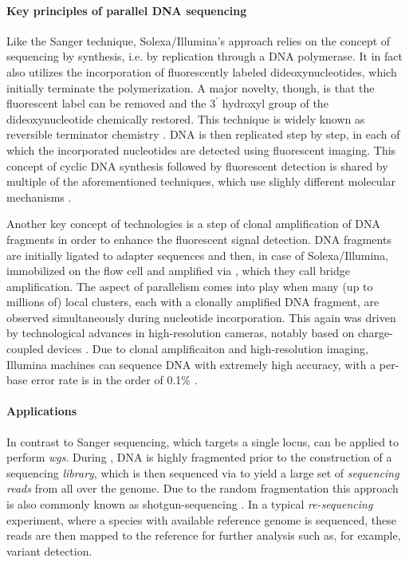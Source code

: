 \paragraph{Key principles of parallel DNA sequencing}
Like the Sanger technique, Solexa/Illumina’s approach relies on the concept of
sequencing by synthesis, i.e. by replication through a DNA polymerase. It in
fact also utilizes the incorporation of fluorescently labeled dideoxynucleotides,
which initially terminate the polymerization. A major novelty, though, is that
the fluorescent label can be removed and the $3^\prime$ hydroxyl group of the
dideoxynucleotide chemically restored. This technique is widely known as
reversible terminator chemistry \citep{Turcatti2008}. DNA is then replicated
step by step, in each of which the incorporated nucleotides are detected using
fluorescent imaging. This concept of cyclic DNA synthesis followed by
fluorescent detection is shared by multiple of the aforementioned techniques,
which use slighly different molecular mechanisms \citep{Shendure2008}.

Another key concept of \mps technologies is a step of clonal amplification of
DNA fragments in order to enhance the fluorescent signal detection. DNA
fragments are initially ligated to adapter sequences and then, in case of
Solexa/Illumina, immobilized on the flow cell and amplified via
    \citep{Mullis1990}, which they call bridge amplification.
The aspect of parallelism comes into play when many (up to millions of) local
clusters, each with a clonally amplified DNA fragment, are observed
simultaneously during nucleotide incorporation. This again was driven by
technological advances in high-resolution cameras, notably based on
charge-coupled devices \citep{Barbe1975,Shendure2008}. Due to clonal
amplificaiton and high-resolution imaging, Illumina machines can sequence DNA
with extremely high accuracy, with a per-base error rate is in the order
of 0.1\% \citep{Fox2014}.

\paragraph{Applications}

In contrast to Sanger sequencing, which targets a single locus, \mps can be
applied to perform \emph{\acf{wgs}}. During \wgs, DNA is highly fragmented prior
to the construction of a sequencing \emph{library}, which is then sequenced via \mps to
yield a large set of \emph{sequencing reads} from
all over the genome. Due to the random fragmentation this approach is also
commonly known as shotgun-sequencing \citep{Weber1997}. In a typical
\emph{re-sequencing} experiment, where a species with available reference genome
is sequenced, these reads are then mapped to the reference for further analysis
such as, for example, variant detection.

